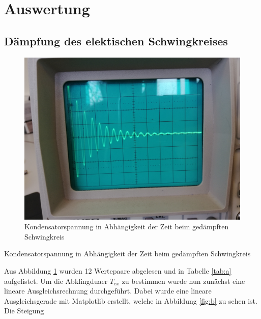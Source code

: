 \section{Auswertung}
\label{sec:Auswertung}
\subsection{Dämpfung des elektischen Schwingkreises}
\label{sec:dae}
\begin{figure}[H]
  \centering
  \includegraphics[width=13cm]{content/Auswertung.jpg}
  \caption{Kondensatorspannung in Abhängigkeit der Zeit beim gedämpften Schwingkreis}
  \label{fig:a1}
\end{figure}

\begin{table}[H]
  \centering
  
  
  \caption{Kondensatorspannung in Abhängigkeit der Zeit beim gedämpften Schwingkreis}
  \label{tab:a}
\end{table}

\noindent Aus Abbildung \ref{fig:a1} wurden 12 Wertepaare
abgelesen und in Tabelle \ref{tab:a} aufgelistet. Um
die Abklingduaer $T_{ex}$ zu bestimmen wurde nun zunächst
eine lineare Ausgleichsrechnung durchgeführt. Dabei
wurde eine lineare Ausgleichsgerade mit Matplotlib
erstellt, welche in Abbildung \ref{fig:b} zu sehen ist.
Die Steigung

